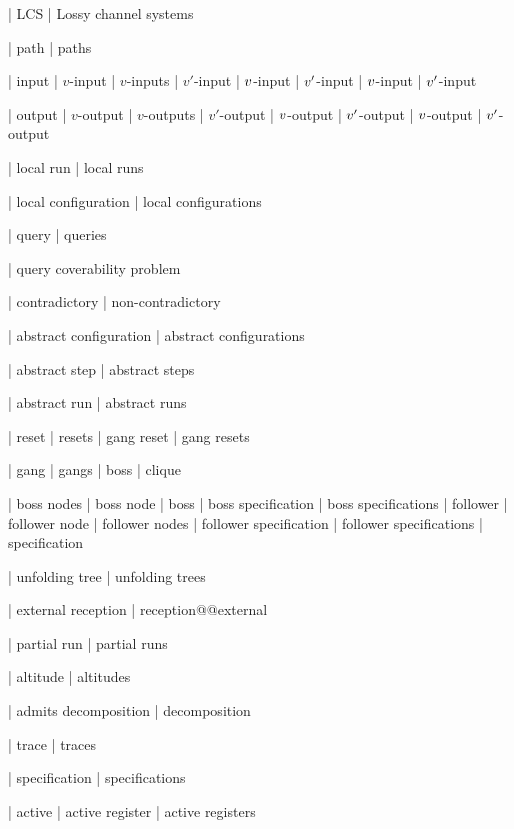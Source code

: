 | LCS 
| Lossy channel systems

| path
| paths

| input
| $v$-input
| $v$-inputs
| $v'$-input
| $v$-input
| $v'$-input
| $v$-input
| $v'$-input

| output
| $v$-output
| $v$-outputs
| $v'$-output
| $v$-output
| $v'$-output
| $v$-output
| $v'$-output

| local run
| local runs

| local configuration
| local configurations

| query
| queries

| query coverability problem

| contradictory
| non-contradictory

| abstract configuration
| abstract configurations

| abstract step
| abstract steps


| abstract run
| abstract runs

| reset
| resets
| gang reset
| gang resets



| gang
| gangs
| boss
| clique


| boss nodes
| boss node
| boss
| boss specification
| boss specifications
| follower
| follower node
| follower nodes
| follower specification
| follower specifications
| specification

| unfolding tree
| unfolding trees

| external reception
| reception@@external

| partial run
| partial runs

| altitude
| altitudes

| admits decomposition
| decomposition

| trace
| traces

| specification
| specifications


| active
| active register
| active registers

